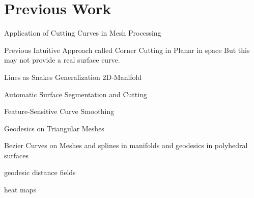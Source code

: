 \documentclass{stdlocal}
\begin{document}
\section{Previous Work} %
\label{sec:previous_work}

  Application of Cutting Curves in Mesh Processing
  \autocite{zachow2003}
  \autocite{benhabiles2011}
  \autocite{ji2006}

  Previous Intuitive Approach called Corner Cutting in Planar
  \autocite{chaikin1974}
  \autocite{dyn1992}
  in space
  \autocite{morera2008}
  But this may not provide a real surface curve.

  Lines as Snakes
  \autocite{kass1988}
  Generalization 2D-Manifold
  \autocite{bischoff2005}
  \autocite{jung2004}

  Automatic Surface Segmentation and Cutting
  \autocite{lee2002}
  \autocite{lee2004}

  Feature-Sensitive Curve Smoothing
  \autocite{lai2007}

  Geodesics on Triangular Meshes
  \autocite{martinez2005}

  Bezier Curves on Meshes
  \autocite{martinez2007}
  and splines in manifolds
  \autocite{hofer2004}
  and geodesics in polyhedral surfaces
  \autocite{polthier2006}
  \autocite{mitchell1987}
  \autocite{surazhsky2005}

  geodesic distance fields
  \autocite{bommes2007}
  \autocite{kimmel1996}

  heat maps
  \autocite{crane2013}

  \autocite{dijkstra1959}

  \autocite{ma2007}
  \autocite{pottmann2005}
  \autocite{levy2002}

\end{document}
